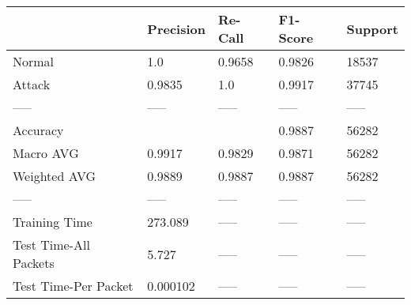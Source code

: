 \begin{tabular}{lllll}
\toprule
{} & Precision & Re-Call & F1-Score & Support \\
\midrule
Normal                &       1.0 &  0.9658 &   0.9826 &   18537 \\
Attack                &    0.9835 &     1.0 &   0.9917 &   37745 \\
-----                 &     ----- &   ----- &    ----- &   ----- \\
Accuracy              &           &         &   0.9887 &   56282 \\
Macro AVG             &    0.9917 &  0.9829 &   0.9871 &   56282 \\
Weighted AVG          &    0.9889 &  0.9887 &   0.9887 &   56282 \\
-----                 &     ----- &   ----- &    ----- &   ----- \\
Training Time         &   273.089 &   ----- &    ----- &   ----- \\
Test Time-All Packets &     5.727 &   ----- &    ----- &   ----- \\
Test Time-Per Packet  &  0.000102 &   ----- &    ----- &   ----- \\
\bottomrule
\end{tabular}
